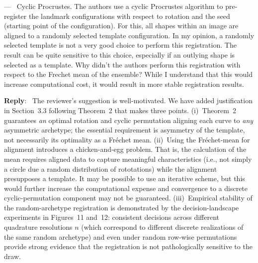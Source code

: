 \documentclass[11pt]{article}
\newcounter{reviewer}
\newcounter{point}[reviewer]
\renewcommand{\thepoint}{Comment\,\thereviewer.\arabic{point}}
\newenvironment{point}
   {\refstepcounter{point} \bigskip \noindent {\textbf{Reviewer~\thepoint} } ---\ }
   {\par }
\newenvironment{reply}
   {\medskip \noindent \color{blue} \begin{sf}\textbf{Reply}:\  }
   {\medskip \par \end{sf}}
\begin{document}
\begin{point}
Cyclic Procrustes. The authors use a cyclic Procrustes algorithm to pre-register the landmark configurations with respect to rotation and the seed (starting point of the configuration). For this, all shapes within an image are aligned to a randomly selected template configuration. In my opinion, a randomly selected template is not a very good choice to perform this registration. The result can be quite sensitive to this choice, especially if an outlying shape is selected as a template. Why didn’t the authors perform this registration with respect to the Frechet mean of the ensemble? While I understand that this would increase computational cost, it would result in more stable registration results.
\end{point}
\begin{reply}
The reviewer's suggestion is well-motivated. We have added justification in Section~3.3 following Theorem~2 that makes three points. (i)~Theorem~2 guarantees \emph{an} optimal rotation and cyclic permutation aligning each curve to \emph{any} asymmetric archetype; the essential requirement is asymmetry of the template, not necessarily its optimality as a Fr\'echet mean. (ii)~Using the Fr\'echet-mean for alignment introduces a chicken-and-egg problem. That is, the calculation of the mean requires aligned data to capture meaningful characteristics (i.e., not simply a circle due a random distribution of rototations) while the alignment presupposes a template. It may be possible to use an iterative scheme, but this would further increase the computational expense and convergence to a discrete cyclic-permutation component may not be guaranteed. (iii)~Empirical stability of the random-archetype registration is demonstrated by the decision-landscape experiments in Figures~11 and~12: consistent decisions across different quadrature resolutions $n$ (which correspond to different discrete realizations of the same random archetype) and even under random row-wise permutations provide strong evidence that the registration is not pathologically sensitive to the draw.
\end{reply}
\end{document}
